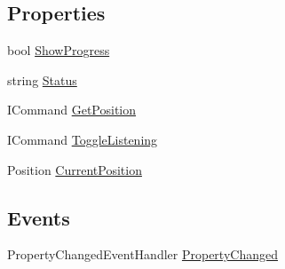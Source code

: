 \subsection*{Properties}
\begin{DoxyCompactItemize}
\item 
bool \hyperlink{class_geolocation_sample_1_1_main_page_view_model_a7abb0a294d8fba398f1a6dfe848a41c3}{Show\+Progress}
\item 
string \hyperlink{class_geolocation_sample_1_1_main_page_view_model_ac8fa387c6811dca5ed7af6f78d25c241}{Status}
\item 
I\+Command \hyperlink{class_geolocation_sample_1_1_main_page_view_model_a6a4de6f48931b508f42b90c016d45c3e}{Get\+Position}
\item 
I\+Command \hyperlink{class_geolocation_sample_1_1_main_page_view_model_ad7f76b80c25153377754e616e8ff1a61}{Toggle\+Listening}
\item 
Position \hyperlink{class_geolocation_sample_1_1_main_page_view_model_ac5be3fba2cf4dcfcc9160bc1985d9e9c}{Current\+Position}
\end{DoxyCompactItemize}
\subsection*{Events}
\begin{DoxyCompactItemize}
\item 
Property\+Changed\+Event\+Handler \hyperlink{class_geolocation_sample_1_1_main_page_view_model_af5ec22b2b5b6eb455e14117617e25428}{Property\+Changed}
\end{DoxyCompactItemize}


